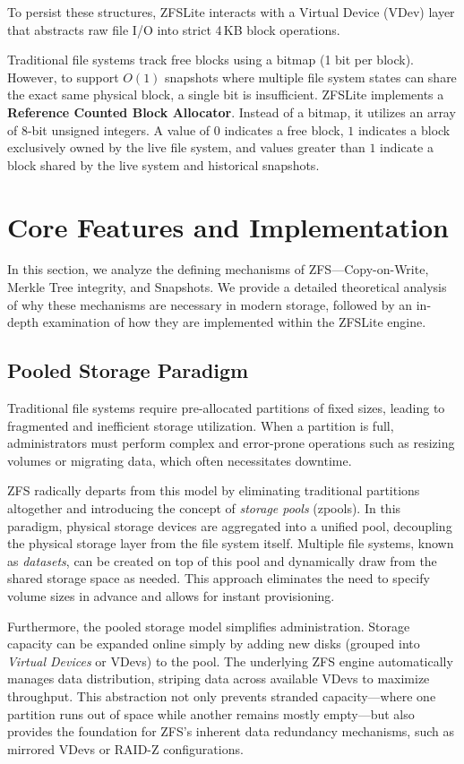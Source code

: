 \documentclass[pdflatex,sn-mathphys-num]{sn-jnl}
\begin{document}
To persist these structures, ZFSLite interacts with a Virtual Device (VDev) layer that abstracts raw file I/O into strict 4\,KB block operations. 

Traditional file systems track free blocks using a bitmap (1 bit per block). However, to support $O(1)$ snapshots where multiple file system states can share the exact same physical block, a single bit is insufficient. ZFSLite implements a \textbf{Reference Counted Block Allocator}. Instead of a bitmap, it utilizes an array of 8-bit unsigned integers. A value of $0$ indicates a free block, $1$ indicates a block exclusively owned by the live file system, and values greater than $1$ indicate a block shared by the live system and historical snapshots.

\section{Core Features and Implementation}\label{sec:deepdive}

In this section, we analyze the defining mechanisms of ZFS---Copy-on-Write, Merkle Tree integrity, and Snapshots. We provide a detailed theoretical analysis of why these mechanisms are necessary in modern storage, followed by an in-depth examination of how they are implemented within the ZFSLite engine.

\subsection{Pooled Storage Paradigm}

Traditional file systems require pre-allocated partitions of fixed sizes, leading to fragmented and inefficient storage utilization. When a partition is full, administrators must perform complex and error-prone operations such as resizing volumes or migrating data, which often necessitates downtime. 

ZFS radically departs from this model by eliminating traditional partitions altogether and introducing the concept of \textit{storage pools} (zpools). In this paradigm, physical storage devices are aggregated into a unified pool, decoupling the physical storage layer from the file system itself. Multiple file systems, known as \textit{datasets}, can be created on top of this pool and dynamically draw from the shared storage space as needed. This approach eliminates the need to specify volume sizes in advance and allows for instant provisioning.

Furthermore, the pooled storage model simplifies administration. Storage capacity can be expanded online simply by adding new disks (grouped into \textit{Virtual Devices} or VDevs) to the pool. The underlying ZFS engine automatically manages data distribution, striping data across available VDevs to maximize throughput. This abstraction not only prevents stranded capacity---where one partition runs out of space while another remains mostly empty---but also provides the foundation for ZFS's inherent data redundancy mechanisms, such as mirrored VDevs or RAID-Z configurations.
\end{document}
